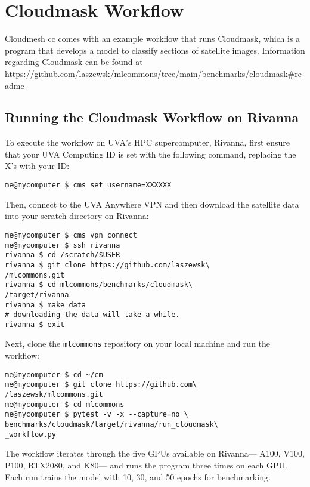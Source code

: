 
\section{Cloudmask Workflow}\label{cloudmask-workflow}

Cloudmesh cc comes with an example workflow that runs Cloudmask, which
is a program that develops a model to classify sections of satellite
images. Information regarding Cloudmask can be found at
\url{https://github.com/laszewsk/mlcommons/tree/main/benchmarks/cloudmask\#readme}

\subsection{Running the Cloudmask Workflow on
Rivanna}\label{running-the-cloudmask-workflow-on-rivanna}

To execute the workflow on UVA's HPC supercomputer, Rivanna, first
ensure that your UVA Computing ID is set with the following command,
replacing the X's with your ID:

\begin{verbatim}
me@mycomputer $ cms set username=XXXXXX
\end{verbatim}

Then, connect to the UVA Anywhere VPN and then download the satellite
data into your
\href{https://www.rc.virginia.edu/userinfo/storage/non-sensitive-data/\#scratch}{scratch}
directory on Rivanna:

\begin{verbatim}
me@mycomputer $ cms vpn connect
me@mycomputer $ ssh rivanna
rivanna $ cd /scratch/$USER
rivanna $ git clone https://github.com/laszewsk\
/mlcommons.git
rivanna $ cd mlcommons/benchmarks/cloudmask\
/target/rivanna
rivanna $ make data
# downloading the data will take a while.
rivanna $ exit
\end{verbatim}

Next, clone the \texttt{mlcommons} repository on your local machine and
run the workflow:

\begin{verbatim}
me@mycomputer $ cd ~/cm
me@mycomputer $ git clone https://github.com\
/laszewsk/mlcommons.git
me@mycomputer $ cd mlcommons
me@mycomputer $ pytest -v -x --capture=no \ 
benchmarks/cloudmask/target/rivanna/run_cloudmask\
_workflow.py
\end{verbatim}

The workflow iterates through the five GPUs available on Rivanna---
A100, V100, P100, RTX2080, and K80--- and runs the program three times
on each GPU. Each run trains the model with 10, 30, and 50 epochs for
benchmarking.

